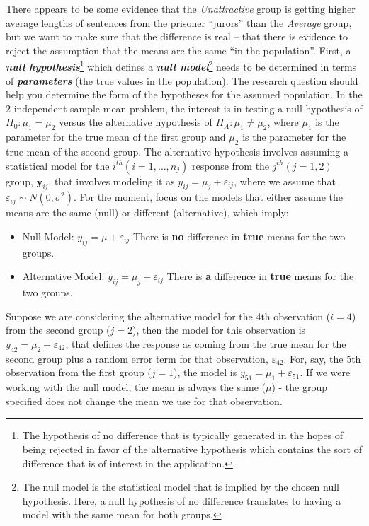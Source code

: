 \documentclass[]{book}
\let\rmarkdownfootnote\footnote%
\def\footnote{\protect\rmarkdownfootnote}
\theoremstyle{definition}
\theoremstyle{definition}
\theoremstyle{remark}
\begin{document}
There appears to be some evidence that the \emph{Unattractive} group is
getting higher average lengths of sentences from the prisoner ``jurors''
than the \emph{Average} group, but we want to make sure that the
difference is real -- that there is evidence to reject the assumption
that the means are the same ``in the population''. First, a
\textbf{\emph{null hypothesis}}\footnote{The hypothesis of no difference
  that is typically generated in the hopes of being rejected in favor of
  the alternative hypothesis which contains the sort of difference that
  is of interest in the application.} which defines a \textbf{\emph{null
model}}\footnote{The null model is the statistical model that is implied
  by the chosen null hypothesis. Here, a null hypothesis of no
  difference translates to having a model with the same mean for both
  groups.} needs to be determined in terms of \textbf{\emph{parameters}}
(the true values in the population). The research question should help
you determine the form of the hypotheses for the assumed population. In
the 2 independent sample mean problem, the interest is in testing a null
hypothesis of \(H_0: \mu_1 = \mu_2\) versus the alternative hypothesis
of \(H_A: \mu_1 \ne \mu_2\), where \(\mu_1\) is the parameter for the
true mean of the first group and \(\mu_2\) is the parameter for the true
mean of the second group. The alternative hypothesis involves assuming a
statistical model for the \(i^{th} (i=1,\ldots,n_j)\) response from the
\(j^{th} (j=1,2)\) group, \(\boldsymbol{y}_{ij}\), that involves
modeling it as \(y_{ij} = \mu_j + \varepsilon_{ij}\), where we assume
that \(\varepsilon_{ij} \sim N(0,\sigma^2)\). For the moment, focus on
the models that either assume the means are the same (null) or different
(alternative), which imply:

\begin{itemize}
\item
  Null Model: \(y_{ij} = \mu + \varepsilon_{ij}\) There is \textbf{no}
  difference in \textbf{true} means for the two groups.
\item
  Alternative Model: \(y_{ij} = \mu_j + \varepsilon_{ij}\) There is
  \textbf{a} difference in \textbf{true} means for the two groups.
\end{itemize}

Suppose we are considering the alternative model for the 4th observation
(\(i=4\)) from the second group (\(j=2\)), then the model for this
observation is \(y_{42} = \mu_2 +\varepsilon_{42}\), that defines the
response as coming from the true mean for the second group plus a random
error term for that observation, \(\varepsilon_{42}\). For, say, the 5th
observation from the first group (\(j=1\)), the model is
\(y_{51} = \mu_1 +\varepsilon_{51}\). If we were working with the null
model, the mean is always the same (\(\mu\)) - the group specified does
not change the mean we use for that observation.
\end{document}
